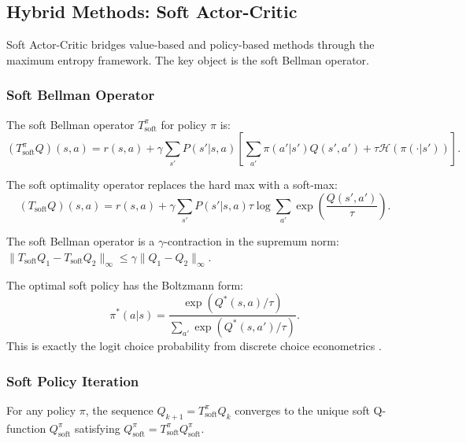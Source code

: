 \subsection{Hybrid Methods: Soft Actor-Critic}
\label{sec:sac}

Soft Actor-Critic \citep{Haarnoja2018} bridges value-based and policy-based methods through the maximum entropy framework. The key object is the soft Bellman operator.

\subsubsection{Soft Bellman Operator}

\begin{definition}
The soft Bellman operator $T^\pi_{\text{soft}}$ for policy $\pi$ is:
\begin{equation}
(T^\pi_{\text{soft}} Q)(s,a) = r(s,a) + \gamma \sum_{s'} P(s'|s,a) \left[ \sum_{a'} \pi(a'|s') Q(s',a') + \tau \mathcal{H}(\pi(\cdot|s')) \right].
\end{equation}
\end{definition}

The soft optimality operator replaces the hard max with a soft-max:
\begin{equation}
(T_{\text{soft}} Q)(s,a) = r(s,a) + \gamma \sum_{s'} P(s'|s,a) \tau \log \sum_{a'} \exp\left(\frac{Q(s',a')}{\tau}\right).
\end{equation}

\begin{lemma}
\label{lem:soft_contraction}
The soft Bellman operator is a $\gamma$-contraction in the supremum norm: $\|T_{\text{soft}} Q_1 - T_{\text{soft}} Q_2\|_\infty \leq \gamma \|Q_1 - Q_2\|_\infty$.
\end{lemma}

The optimal soft policy has the Boltzmann form:
\begin{equation}
\pi^*(a|s) = \frac{\exp(Q^*(s,a)/\tau)}{\sum_{a'} \exp(Q^*(s,a')/\tau)}.
\end{equation}
This is exactly the logit choice probability from discrete choice econometrics \citep{Rust1987}.


\subsubsection{Soft Policy Iteration}

\begin{lemma}
\label{lem:soft_eval}
For any policy $\pi$, the sequence $Q_{k+1} = T^\pi_{\text{soft}} Q_k$ converges to the unique soft Q-function $Q^\pi_{\text{soft}}$ satisfying $Q^\pi_{\text{soft}} = T^\pi_{\text{soft}} Q^\pi_{\text{soft}}$.
\end{lemma}

